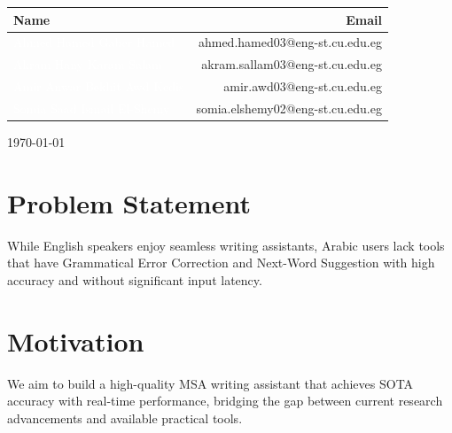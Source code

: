 \documentclass{article}
\begin{document}
\begin{titlepage}
\begin{center}
    \vspace{1cm}

    \begin{tcolorbox}[mainbox, title=\textcolor{white}{Team Contact Information}, sharp corners=north, sharp corners=south]
        \renewcommand{\arraystretch}{1.2}
        \begin{tabularx}{\textwidth}{Xr}
            \textbf{\textcolor{accentgold}{Name}} & \textbf{\textcolor{accentgold}{Email}} \\
            \midrule
            \textcolor{white}{Ahmed Hamed Gaber Hamed} & \textcolor{secondarygrey}{ahmed.hamed03@eng-st.cu.edu.eg} \\
            \textcolor{white}{Akram Hany Karam Salam} & \textcolor{secondarygrey}{akram.sallam03@eng-st.cu.edu.eg} \\
            \textcolor{white}{Amir Anwar Bekhit Awd Kedis} & \textcolor{secondarygrey}{amir.awd03@eng-st.cu.edu.eg} \\
            \textcolor{white}{Somia Saad Ismail El-Shemy} & \textcolor{secondarygrey}{somia.elshemy02@eng-st.cu.edu.eg} \\
        \end{tabularx}
    \end{tcolorbox}
\end{center}

\begin{center}
    \vspace{1cm}
    {\large \today \par}
\end{center}

    \vfill
\end{titlepage}

\newpage
\setcounter{page}{1}



\section{\textcolor{accentred}{Problem Statement}}
While English speakers enjoy seamless writing assistants, Arabic users lack tools that have Grammatical Error Correction and Next-Word Suggestion with high accuracy and without significant input latency.

\section{\textcolor{accentred}{Motivation}}
We aim to build a high-quality MSA writing assistant that achieves SOTA accuracy with real-time performance, bridging the gap between current research advancements and available practical tools.
\end{document}
